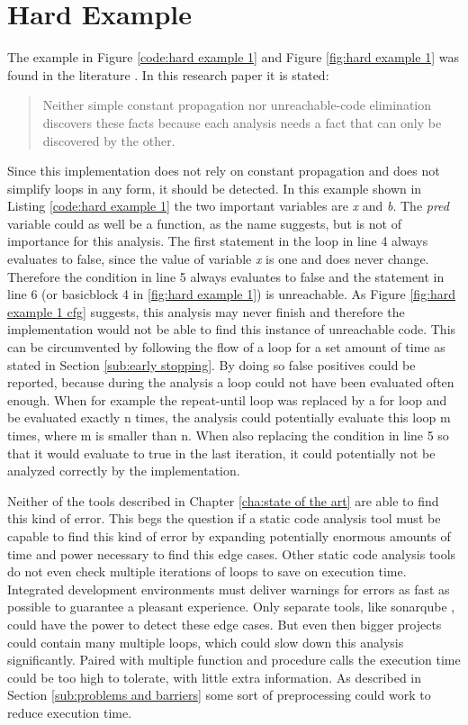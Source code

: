 \section{Hard Example}
The example in Figure \ref{code:hard example 1} and Figure \ref{fig:hard example 1} was found in the literature \cite{Click_1995}. In this research paper it is stated:
\begin{quote}
	Neither
	simple constant
	propagation
	nor unreachable-code elimination
	discovers these facts because
	each analysis
	needs a fact
	that can only be discovered
	by the other.
\end{quote}
Since this implementation does not rely on constant propagation and does not simplify loops in any form, it should be detected. In this example shown in Listing \ref{code:hard example 1} the two important variables are \emph{x} and \emph{b}. The \emph{pred} variable could as well be a function, as the name suggests, but is not of importance for this analysis. The first statement in the loop in line 4 always evaluates to false, since the value of variable \emph{x} is one and does never change. Therefore the condition in line 5 always evaluates to false and the statement in line 6 (or basicblock 4 in \ref{fig:hard example 1}) is unreachable. As Figure \ref{fig:hard example 1 cfg} suggests, this analysis may never finish and therefore the implementation would not be able to find this instance of unreachable code. This can be circumvented by following the flow of a loop for a set amount of time as stated in Section \ref{sub:early stopping}. By doing so false positives could be reported, because during the analysis a loop could not have been evaluated often enough. When for example the repeat-until loop was replaced by a for loop and be evaluated exactly n times, the analysis could potentially evaluate this loop m times, where m is smaller than n. When also replacing the condition in line 5 so that it would evaluate to true in the last iteration, it could potentially not be analyzed correctly by the implementation.

Neither of the tools described in Chapter \ref{cha:state of the art} are able to find this kind of error.
This begs the question if a static code analysis tool must be capable to find this kind of error by expanding potentially enormous amounts of time and power necessary to find this edge cases. Other static code analysis tools do not even check multiple iterations of loops to save on execution time. Integrated development environments must deliver warnings for errors as fast as possible to guarantee a pleasant experience. Only separate tools, like sonarqube \cite{sonarqube}, could have the power to detect these edge cases. But even then bigger projects could contain many multiple loops, which could slow down this analysis significantly. Paired with multiple function and procedure calls the execution time could be too high to tolerate, with little extra information. As described in Section \ref{sub:problems and barriers} some sort of preprocessing could work to reduce execution time.

